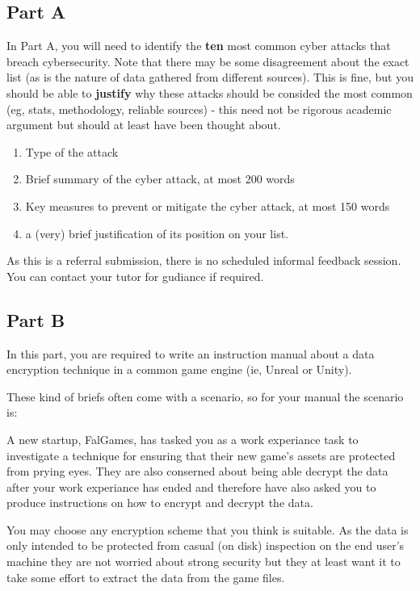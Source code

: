 \documentclass{../../fal_assignment}
\begin{document}
\subsection*{Part A}
In Part A, you will need to identify the \textbf{ten} most common cyber attacks that breach cybersecurity. Note that there may be some disagreement about the exact list (as is the nature of data gathered from different sources). This is fine, but you should be able to \textbf{justify} why these attacks should be consided the most common (eg, stats, methodology, reliable sources) - this need not be rigorous academic argument but should at least have been thought about.

\begin{enumerate}[label=(\roman*)]
 \item Type of the attack
 \item Brief summary of the cyber attack, at most 200 words
 \item Key measures to prevent or mitigate the cyber attack, at most 150 words
 \item a (very) brief justification of its position on your list.
\end{enumerate}

As this is a referral submission, there is no scheduled informal feedback session. You can contact your tutor for gudiance if required.

\subsection*{Part B}
In this part, you are required to write an instruction manual about a data encryption technique in a common game engine (ie, Unreal or Unity).

These kind of briefs often come with a scenario, so for your manual the scenario is:

A new startup, FalGames, has tasked you as a work experiance task to investigate a technique for ensuring that their new game's assets are protected from prying eyes. They are also conserned about being able decrypt the data after your work experiance has ended and therefore have also asked you to produce instructions on how to encrypt and decrypt the data.

You may choose any encryption scheme that you think is suitable. As the data is only intended to be protected from casual (on disk) inspection on the end user's machine they are not worried about strong security but they at least want it to take some effort to extract the data from the game files.
\end{document}
